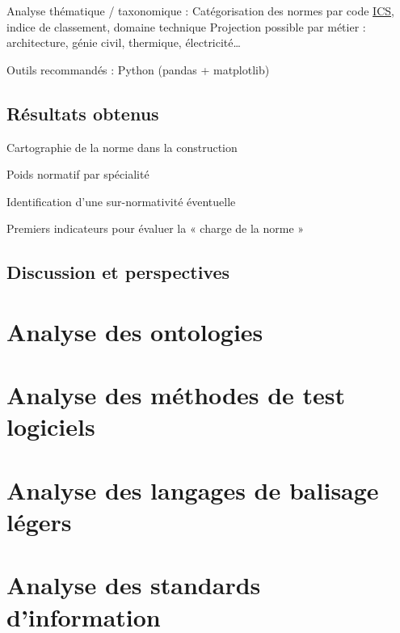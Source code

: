 \documentclass[a4paper,12pt]{article}
\begin{document}
Analyse thématique / taxonomique :
    Catégorisation des normes par code \protect\hyperlink{gls-21}{\label{gls-21-use-3}ICS}, indice de classement, domaine technique
    Projection possible par métier : architecture, génie civil, thermique, électricité…

Outils recommandés : Python (pandas + matplotlib)
\subsection{Résultats obtenus}
\label{sec:orge08d938}
Cartographie de la norme dans la construction

Poids normatif par spécialité

Identification d’une sur-normativité éventuelle

Premiers indicateurs pour évaluer la « charge de la norme »
\subsection{Discussion et perspectives}
\label{sec:org5f84113}
\clearpage
\section{Analyse des ontologies}
\label{sec:org2de69b2}
\section{Analyse des méthodes de test logiciels}
\label{sec:org13763f8}
\section{Analyse des langages de balisage légers}
\label{sec:org62991f0}
\section{Analyse des standards d'information}
\label{sec:orgd78c6fb}
\clearpage
\end{document}

